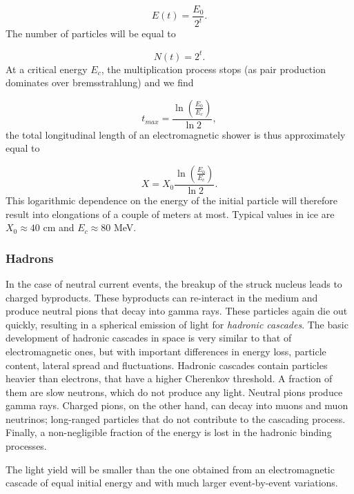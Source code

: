 \begin{equation}
E(t) = \frac{E_0}{2^t}.
\end{equation}
The number of particles will be equal to

\begin{equation}
N(t) = 2^t.
\end{equation}
At a critical energy $E_c$, the multiplication process stops (as pair production dominates over bremsstrahlung) and we find

\begin{equation}
t_{max} = \frac{\ln\left(\frac{E_0}{E_c}\right)}{\ln 2},
\end{equation}
the total longitudinal length of an electromagnetic shower is thus approximately equal to

\begin{equation}
X = X_0 \frac{\ln\left(\frac{E_0}{E_c}\right)}{\ln 2}.
\end{equation}
This logarithmic dependence on the energy of the initial particle will therefore result into elongations of a couple of meters at most. Typical values in ice are $X_0 \approx 40$ cm and $E_c \approx 80$ MeV.

\subsubsection{Hadrons}
In the case of neutral current events, the breakup of the struck nucleus leads to charged byproducts. These byproducts can re-interact in the medium and produce neutral pions that decay into gamma rays. These particles again die out quickly, resulting in a spherical emission of light for \textit{hadronic cascades}. The basic development of hadronic cascades in space is very similar to that of electromagnetic ones, but with important differences in energy loss, particle content, lateral spread and fluctuations. Hadronic cascades contain particles heavier than electrons, that have a higher Cherenkov threshold. A fraction of them are slow neutrons, which do not produce any light. Neutral pions produce gamma rays. Charged pions, on the other hand, can decay into muons and muon neutrinos; long-ranged particles that do not contribute to the cascading process. Finally, a non-negligible fraction of the energy is lost in the hadronic binding processes.

The light yield will be smaller than the one obtained from an electromagnetic cascade of equal initial energy and with much larger event-by-event variations. 


